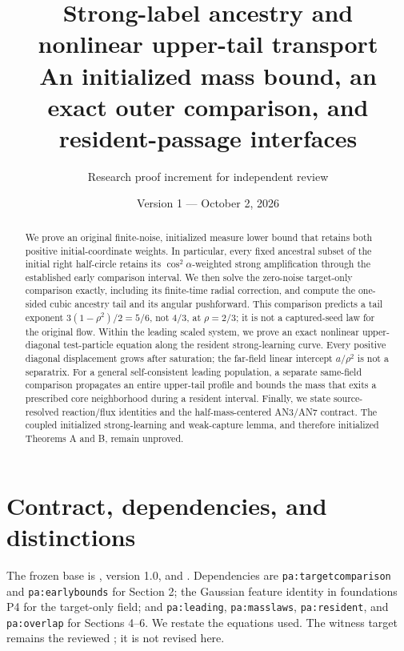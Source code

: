 \documentclass[11pt]{article}
\title{Strong-label ancestry and nonlinear upper-tail transport\\
\large An initialized mass bound, an exact outer comparison, and resident-passage interfaces}
\author{Research proof increment for independent review}
\date{Version 1 --- October 2, 2026}
\numberwithin{equation}{section}
\theoremstyle{remark}\newtheorem{remark}[theorem]{Remark}
\newcommand{\1}{\mathbf 1}
\begin{document}
\maketitle
\begin{abstract}
We prove an original finite-noise, initialized measure lower bound that retains
both positive initial-coordinate weights. In particular, every fixed ancestral
subset of the initial right half-circle retains its $\cos^2\alpha$-weighted
strong amplification through the established early comparison interval. We
then solve the zero-noise target-only comparison exactly, including its
finite-time radial correction, and compute the one-sided cubic ancestry
tail and its angular pushforward. This comparison predicts a tail exponent
$3(1-\rho^2)/2=5/6$, not $4/3$, at $\rho=2/3$; it is not a captured-seed
law for the original flow. Within the leading scaled system, we prove an
exact nonlinear upper-diagonal test-particle equation along the resident
strong-learning curve. Every positive diagonal displacement grows after
saturation; the far-field linear intercept $a/\rho^2$ is not a separatrix.
For a general self-consistent leading population, a separate same-field
comparison propagates an entire upper-tail profile and bounds the mass that
exits a prescribed core neighborhood during a resident interval. Finally,
we state source-resolved reaction/flux identities and the half-mass-centered
AN3/AN7 contract. The coupled initialized strong-learning and weak-capture
lemma, and therefore initialized Theorems A and B, remain unproved.
\end{abstract}

\section{Contract, dependencies, and distinctions}
\label{inc:AN02:tail:v1:contract}
The frozen base is , version 1.0,
and . Dependencies are
\texttt{pa:targetcomparison} and \texttt{pa:earlybounds} for Section 2;
the Gaussian feature identity in foundations P4 for the target-only field;
and \texttt{pa:leading}, \texttt{pa:masslaws}, \texttt{pa:resident}, and
\texttt{pa:overlap} for Sections 4--6. We restate the equations used.
The witness target remains the reviewed
; it is not revised here.
\end{document}
